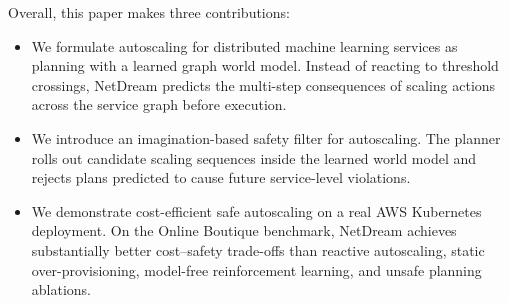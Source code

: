 Overall, this paper makes three contributions:

\begin{itemize}
\item We formulate autoscaling for distributed machine learning services
as planning with a learned graph world model. Instead of reacting to
threshold crossings, NetDream predicts the multi-step consequences of
scaling actions across the service graph before execution.

\item We introduce an imagination-based safety filter for autoscaling.
The planner rolls out candidate scaling sequences inside the learned
world model and rejects plans predicted to cause future service-level
violations.

\item We demonstrate cost-efficient safe autoscaling on a real AWS
Kubernetes deployment. On the Online Boutique benchmark, NetDream
achieves substantially better cost--safety trade-offs than reactive
autoscaling, static over-provisioning, model-free reinforcement learning,
and unsafe planning ablations.
\end{itemize}